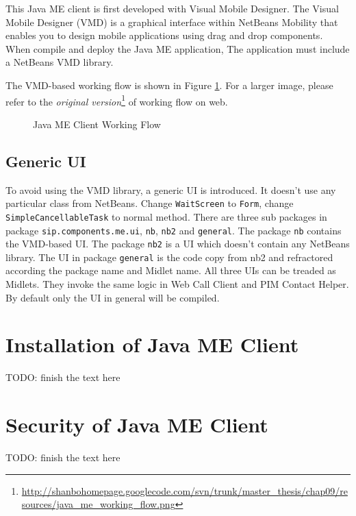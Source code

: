 This Java ME client is first developed with Visual Mobile Designer. The Visual Mobile Designer (VMD) is a graphical interface within NetBeans Mobility that enables you to design mobile applications using drag and drop components. When compile and deploy the Java ME application, The application must include a NetBeans VMD library.

The VMD-based working flow is shown in Figure \ref{fig:JavaMEClientWorkingFlow}. For a larger image, please refer to the \textit{original version}\footnote{\url{http://shanbohomepage.googlecode.com/svn/trunk/master_thesis/chap09/resources/java_me_working_flow.png}} of working flow on web. 

\begin{figure}[!hbtp]
\centering
{}
\caption{Java ME Client Working Flow}
\label{fig:JavaMEClientWorkingFlow}
\end{figure}


\subsection{Generic UI}
\label{sec:JavaMEClient:UserInterface:GenericUI}

To avoid using the VMD library, a generic UI is introduced. It doesn't use any particular class from NetBeans. Change \texttt{WaitScreen} to \texttt{Form}, change \\ \texttt{SimpleCancellableTask} to normal method. There are three sub packages in package \texttt{sip.components.me.ui}, \texttt{nb}, \texttt{nb2} and \texttt{general}. The package \texttt{nb} contains the VMD-based UI. The package \texttt{nb2} is a UI which doesn't contain any NetBeans library. The UI in package \texttt{general} is the code copy from nb2 and refractored according the package name and Midlet name. All three UIs can be treaded as Midlets.  They invoke the same logic in \textsf{Web Call Client} and \textsf{PIM Contact Helper}. By default only the UI in general will be compiled.

\section{Installation of Java ME Client}
\label{sec:JavaMEClient:InstallationOfJavaMEClient}

TODO: finish the text here

\section{Security of Java ME Client}
\label{sec:JavaMEClient:SecurityOfJavaMEClient}

TODO: finish the text here

